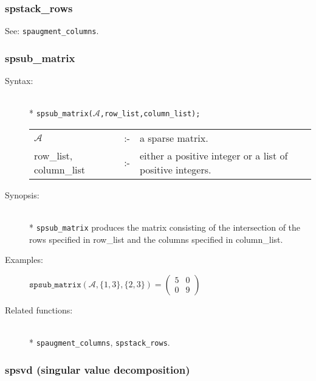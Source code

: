\subsubsection{spstack\_rows}
\label{sparse:spstack_rows}

See: \texttt{spaugment\_columns}.


\subsubsection{spsub\_matrix}
\label{sparse:spsub_matrix}

\begin{description}
\item[Syntax:]\mbox{}\\*
\texttt{spsub\_matrix($\mathcal{A}$,row\_list,column\_list);}\\[2mm]
\begin{tabular}{l l l} 
$\mathcal{A}$              &:-& a sparse matrix. \\
row\_list, column\_list &:-& \parbox[t]{.605\linewidth}{either a 
positive integer or a list of positive integers.}
\end{tabular}

\item[Synopsis:]\mbox{}\\*
\texttt{spsub\_matrix} produces the matrix consisting of the
              intersection of the rows specified in row\_list and the 
columns specified in column\_list. 

\item[Examples:]
\begin{flushleft}  
\hspace*{0.1in}
\begin{math}  
\texttt{spsub\_matrix}(\mathcal{A},\{1,3\},\{2,3\}) =
        \begin{pmatrix} 5 & 0\\ 0 & 9 \end{pmatrix}
\end{math}  
\end{flushleft}

\item[Related functions:]\mbox{}\\*
\texttt{spaugment\_columns}, \texttt{spstack\_rows}.
\end{description}

\subsubsection{spsvd (singular value decomposition)}
\label{sparse:spsvd} 

